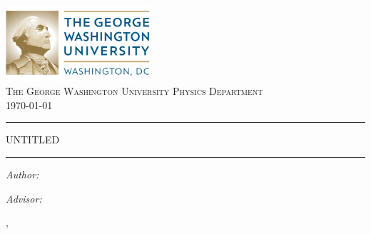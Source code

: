 \documentclass{article}
\begin{document}
\noindent

\begin{center}

\includegraphics[width=0.4\textwidth]{gwulogo}~\\[1cm]

\textsc{\LARGE The George Washington University\vspace{.2cm}
Physics Department}\\[.4cm]

{\large \today}
\vspace{.5cm}

\hrule \vspace{.4cm}
{ \huge \bfseries  

UNTITLED

\vspace{0.2cm} }
\hrule \vspace{1.5cm}

\begin{minipage}{0.4\textwidth}
\begin{flushleft} \large
\emph{Author:}\\

\footnotemark[1]

\end{flushleft}
\end{minipage}
\begin{minipage}{0.4\textwidth}
\begin{flushright} \large
\emph{Advisor:} \\
\footnotemark[2]
\end{flushright}
\end{minipage}
\end{center}

\vspace{.4cm}


\vfill
{} 
, 

\end{document}
